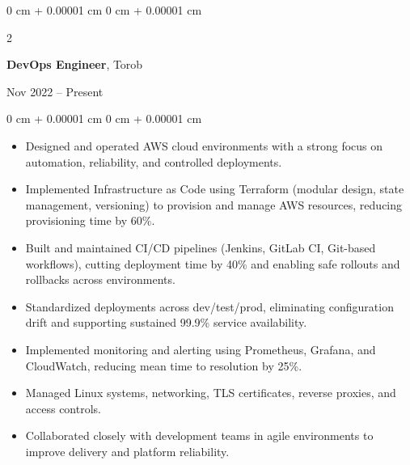 \documentclass[10pt, letterpaper]{article}
\newenvironment{highlights}{
    \begin{itemize}[
        topsep=0.10 cm,
        parsep=0.10 cm,
        partopsep=0pt,
        itemsep=0pt,
        leftmargin=0 cm + 10pt
    ]
}{
    \end{itemize}
} %
\newenvironment{onecolentry}{
    \begin{adjustwidth}{
        0 cm + 0.00001 cm
    }{
        0 cm + 0.00001 cm
    }
}{
    \end{adjustwidth}
} %
\newenvironment{twocolentry}[2][]{
    \onecolentry
    \def\secondColumn{#2}
    \setcolumnwidth{\fill, 4.5 cm}
    \begin{paracol}{2}
}{
    \switchcolumn \raggedleft \secondColumn
    \end{paracol}
    \endonecolentry
} %
\begin{document}
                \vspace{0.2 cm}

                \begin{twocolentry}{Nov 2022 -- Present}
                    \textbf{DevOps Engineer}, Torob
                \end{twocolentry}
                \vspace{0.10 cm}
                \begin{onecolentry}
                    \begin{highlights}
                        \item Designed and operated AWS cloud environments with a strong focus on automation, reliability, and controlled deployments.
                        \item Implemented Infrastructure as Code using Terraform (modular design, state management, versioning) to provision and manage AWS resources, reducing provisioning time by 60\%.
                        \item Built and maintained CI/CD pipelines (Jenkins, GitLab CI, Git-based workflows), cutting deployment time by 40\% and enabling safe rollouts and rollbacks across environments.
                        \item Standardized deployments across dev/test/prod, eliminating configuration drift and supporting sustained 99.9\% service availability.
                        \item Implemented monitoring and alerting using Prometheus, Grafana, and CloudWatch, reducing mean time to resolution by 25\%.
                        \item Managed Linux systems, networking, TLS certificates, reverse proxies, and access controls.
                        \item Collaborated closely with development teams in agile environments to improve delivery and platform reliability.
                    \end{highlights}
                \end{onecolentry}

                \vspace{0.2 cm}
\end{document}
